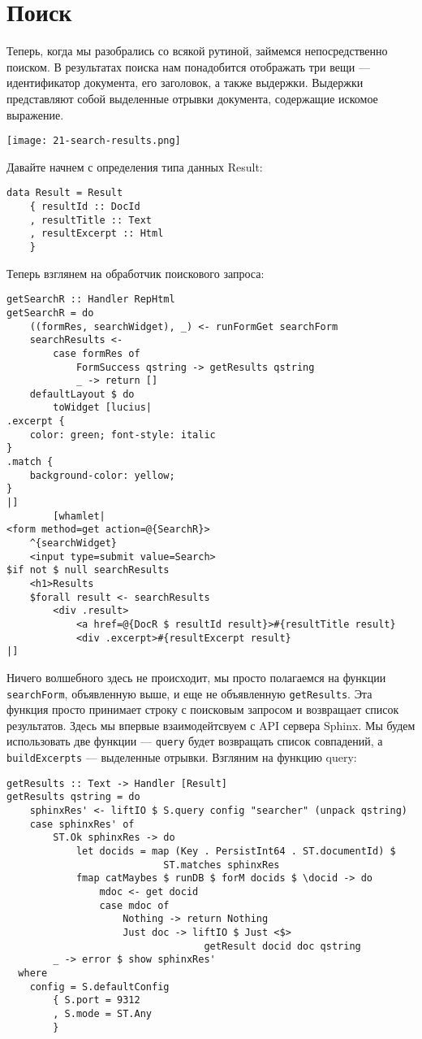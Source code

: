 \section{Поиск} %

Теперь, когда мы разобрались со всякой рутиной, займемся непосредственно поиском. В результатах поиска нам понадобится отображать три вещи --- идентификатор документа, его заголовок, а также выдержки. Выдержки представляют собой выделенные отрывки документа, содержащие искомое выражение.

\texttt{[image: 21-search-results.png]} %

Давайте начнем с определения типа данных Result:

\begin{lstlisting}
data Result = Result
    { resultId :: DocId
    , resultTitle :: Text
    , resultExcerpt :: Html
    }
\end{lstlisting}

Теперь взглянем на обработчик поискового запроса:

\begin{lstlisting}
getSearchR :: Handler RepHtml
getSearchR = do
    ((formRes, searchWidget), _) <- runFormGet searchForm
    searchResults <-
        case formRes of
            FormSuccess qstring -> getResults qstring
            _ -> return []
    defaultLayout $ do
        toWidget [lucius|
.excerpt {
    color: green; font-style: italic
}
.match {
    background-color: yellow;
}
|]
        [whamlet|
<form method=get action=@{SearchR}>
    ^{searchWidget}
    <input type=submit value=Search>
$if not $ null searchResults
    <h1>Results
    $forall result <- searchResults
        <div .result>
            <a href=@{DocR $ resultId result}>#{resultTitle result}
            <div .excerpt>#{resultExcerpt result}
|]
\end{lstlisting}%

Ничего волшебного здесь не происходит, мы просто полагаемся на функции \lstinline'searchForm', объявленную выше, и еще не объявленную \lstinline'getResults'. Эта функция просто принимает строку с поисковым запросом и возвращает список результатов. Здесь мы впервые взаимодейтсвуем с API сервера Sphinx. Мы будем использовать две функции --- \lstinline'query' будет возвращать список совпадений, а \lstinline'buildExcerpts' --- выделенные отрывки. Взгляним на функцию query:

\begin{lstlisting}
getResults :: Text -> Handler [Result]
getResults qstring = do
    sphinxRes' <- liftIO $ S.query config "searcher" (unpack qstring)
    case sphinxRes' of
        ST.Ok sphinxRes -> do
            let docids = map (Key . PersistInt64 . ST.documentId) $
                           ST.matches sphinxRes
            fmap catMaybes $ runDB $ forM docids $ \docid -> do
                mdoc <- get docid
                case mdoc of
                    Nothing -> return Nothing
                    Just doc -> liftIO $ Just <$>
                                  getResult docid doc qstring
        _ -> error $ show sphinxRes'
  where
    config = S.defaultConfig
        { S.port = 9312
        , S.mode = ST.Any
        }
\end{lstlisting}%

